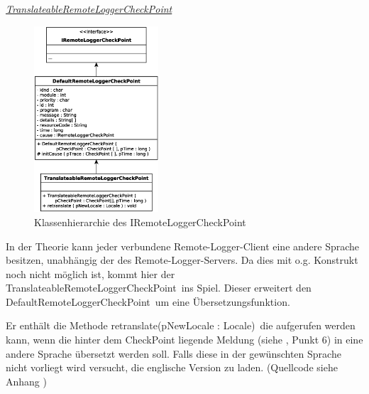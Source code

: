 \par \textit{\underline{TranslateableRemoteLoggerCheckPoint}}\vspace{-13px}
\begin{figure}
	\vspace{10px} \hspace{5px}
	\includegraphics[width=175px]{../img/CD-TranslateableRemoteLoggerCheckPoint.eps}
	\caption{Klassenhierarchie des \glqq IRemoteLoggerCheckPoint\grqq}
\end{figure}
\par In der Theorie kann jeder verbundene Remote-Logger-Client eine andere Sprache besitzen, unabhängig der des Remote-Logger-Servers. Da dies mit o.g. Konstrukt noch nicht möglich ist, kommt hier der \glqq TranslateableRemoteLoggerCheckPoint\grqq\ ins Spiel. Dieser erweitert den \glqq DefaultRemoteLoggerCheckPoint\grqq\ um eine Übersetzungsfunktion.
\par Er enthält die Methode \glqq retranslate(pNewLocale : Locale)\grqq\ die aufgerufen werden kann, wenn die hinter dem CheckPoint liegende Meldung (siehe , Punkt 6) in eine andere Sprache übersetzt werden soll. Falls diese in der gewünschten Sprache nicht vorliegt wird versucht, die englische Version zu laden. (Quellcode siehe Anhang  )

\newpage
\vspace{-2px}
